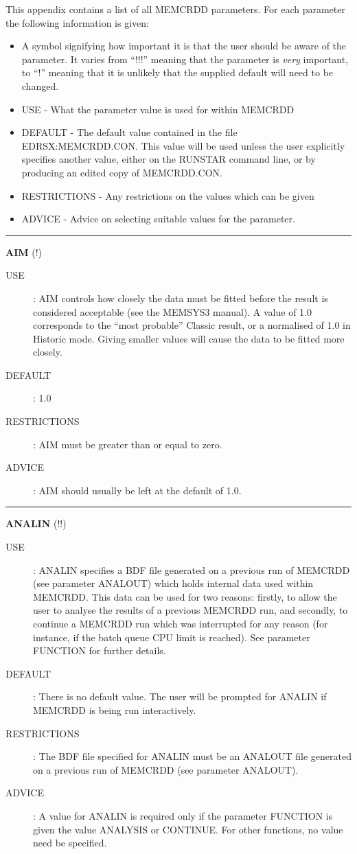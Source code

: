 This appendix contains a list of all MEMCRDD parameters. For each parameter the
following information is given:
\begin{itemize}
\item A symbol signifying how important it is that the user should be aware
of the parameter. It varies from ``!!!'' meaning that the parameter is {\em
very} important, to ``!'' meaning that it is unlikely that the supplied default
will need to be changed.
\item USE - What the parameter value is used for within MEMCRDD
\item DEFAULT - The default value contained in the file EDRSX:MEMCRDD.CON.
This value will be used unless the user explicitly specifies another value,
either on the RUNSTAR command line, or by producing an edited copy of
MEMCRDD.CON.
\item RESTRICTIONS - Any restrictions on the values which can be given
\item ADVICE - Advice on selecting suitable values for the parameter.
\end{itemize}

\rule{\textwidth}{0.3mm}
{\Large {\bf AIM } (!)}
\begin{description}
\item [USE]:
AIM controls how closely the data must be fitted before the result is
considered acceptable (see the MEMSYS3 manual).
A value of 1.0 corresponds to the ``most
probable'' Classic result, or a normalised \chisq of 1.0 in Historic mode.
Giving smaller values will cause the data to be fitted more closely.
\item [DEFAULT]:
1.0
\item [RESTRICTIONS]:
AIM must be greater than or equal to zero.
\item [ADVICE]:
AIM should usually be left at the default of 1.0.
\end {description}


\rule{\textwidth}{0.3mm}
{\Large {\bf ANALIN} (!!)}
\begin{description}
\item [USE]:
ANALIN specifies a BDF file generated on a previous run of MEMCRDD
(see parameter ANALOUT) which holds internal data used within MEMCRDD.
This data can be used for two reasons: firstly,  to allow the user to analyse
the results of a previous MEMCRDD run, and secondly, to continue a MEMCRDD
run which was interrupted for any reason (for instance, if the batch
queue CPU limit is reached). See parameter FUNCTION for further details.
\item [DEFAULT]:
There is no default value. The user will be prompted for ANALIN if MEMCRDD
is being run interactively.
\item [RESTRICTIONS]:
The BDF file specified for ANALIN must be an ANALOUT file generated on
a previous run of MEMCRDD (see parameter ANALOUT).
\item [ADVICE]:
A value for ANALIN is required only if the parameter FUNCTION is given the value
ANALYSIS or CONTINUE. For other functions, no value need be specified.
\end {description}


